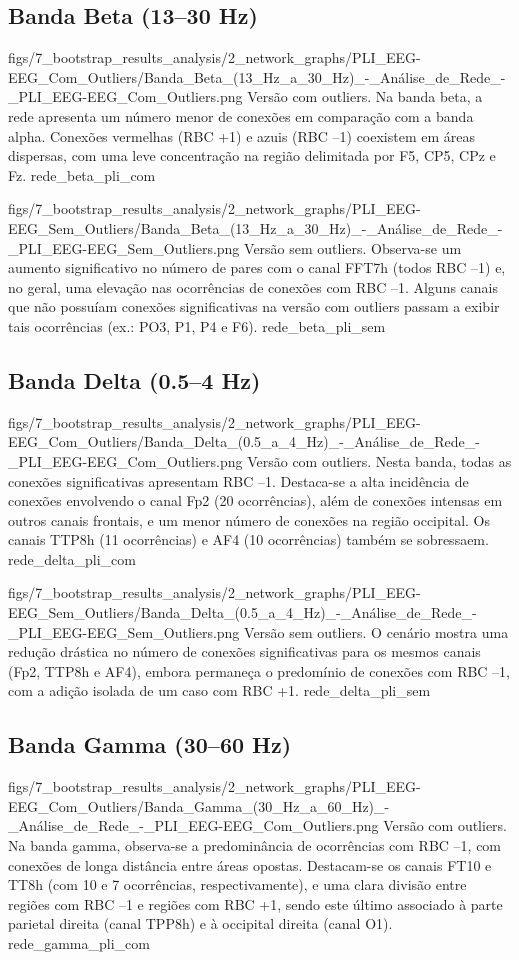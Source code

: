 \subsection{Banda Beta (13–30 Hz)}
\standardfigure
{figs/7_bootstrap_results_analysis/2_network_graphs/PLI_EEG-EEG_Com_Outliers/Banda_Beta_(13_Hz_a_30_Hz)_-_Análise_de_Rede_-_PLI_EEG-EEG_Com_Outliers.png}
{Versão com outliers. Na banda beta, a rede apresenta um número menor de conexões em comparação com a banda alpha. Conexões vermelhas (RBC +1) e azuis (RBC –1) coexistem em áreas dispersas, com uma leve concentração na região delimitada por F5, CP5, CPz e Fz.}
{rede_beta_pli_com}

\standardfigure
{figs/7_bootstrap_results_analysis/2_network_graphs/PLI_EEG-EEG_Sem_Outliers/Banda_Beta_(13_Hz_a_30_Hz)_-_Análise_de_Rede_-_PLI_EEG-EEG_Sem_Outliers.png}
{Versão sem outliers. Observa-se um aumento significativo no número de pares com o canal FFT7h (todos RBC –1) e, no geral, uma elevação nas ocorrências de conexões com RBC –1. Alguns canais que não possuíam conexões significativas na versão com outliers passam a exibir tais ocorrências (ex.: PO3, P1, P4 e F6).}
{rede_beta_pli_sem}


\subsection{Banda Delta (0.5–4 Hz)}
\standardfigure
{figs/7_bootstrap_results_analysis/2_network_graphs/PLI_EEG-EEG_Com_Outliers/Banda_Delta_(0.5_a_4_Hz)_-_Análise_de_Rede_-_PLI_EEG-EEG_Com_Outliers.png}
{Versão com outliers. Nesta banda, todas as conexões significativas apresentam RBC –1. Destaca-se a alta incidência de conexões envolvendo o canal Fp2 (20 ocorrências), além de conexões intensas em outros canais frontais, e um menor número de conexões na região occipital. Os canais TTP8h (11 ocorrências) e AF4 (10 ocorrências) também se sobressaem.}
{rede_delta_pli_com}

\standardfigure
{figs/7_bootstrap_results_analysis/2_network_graphs/PLI_EEG-EEG_Sem_Outliers/Banda_Delta_(0.5_a_4_Hz)_-_Análise_de_Rede_-_PLI_EEG-EEG_Sem_Outliers.png}
{Versão sem outliers. O cenário mostra uma redução drástica no número de conexões significativas para os mesmos canais (Fp2, TTP8h e AF4), embora permaneça o predomínio de conexões com RBC –1, com a adição isolada de um caso com RBC +1.}
{rede_delta_pli_sem}


\subsection{Banda Gamma (30–60 Hz)}
\standardfigure
{figs/7_bootstrap_results_analysis/2_network_graphs/PLI_EEG-EEG_Com_Outliers/Banda_Gamma_(30_Hz_a_60_Hz)_-_Análise_de_Rede_-_PLI_EEG-EEG_Com_Outliers.png}
{Versão com outliers. Na banda gamma, observa-se a predominância de ocorrências com RBC –1, com conexões de longa distância entre áreas opostas. Destacam-se os canais FT10 e TT8h (com 10 e 7 ocorrências, respectivamente), e uma clara divisão entre regiões com RBC –1 e regiões com RBC +1, sendo este último associado à parte parietal direita (canal TPP8h) e à occipital direita (canal O1).}
{rede_gamma_pli_com}


